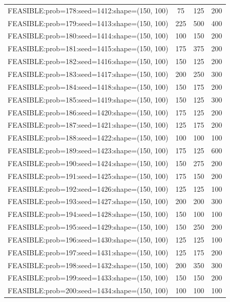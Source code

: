 \begin{longtable}{lccc}
FEASIBLE:prob=178:seed=1412:shape=(150, 100) &       75 &   125 &    200 \\
FEASIBLE:prob=179:seed=1413:shape=(150, 100) &      225 &   500 &    400 \\
FEASIBLE:prob=180:seed=1414:shape=(150, 100) &      100 &   150 &    200 \\
FEASIBLE:prob=181:seed=1415:shape=(150, 100) &      175 &   375 &    200 \\
FEASIBLE:prob=182:seed=1416:shape=(150, 100) &      150 &   125 &    200 \\
FEASIBLE:prob=183:seed=1417:shape=(150, 100) &      200 &   250 &    300 \\
FEASIBLE:prob=184:seed=1418:shape=(150, 100) &      150 &   175 &    200 \\
FEASIBLE:prob=185:seed=1419:shape=(150, 100) &      150 &   125 &    300 \\
FEASIBLE:prob=186:seed=1420:shape=(150, 100) &      175 &   125 &    200 \\
FEASIBLE:prob=187:seed=1421:shape=(150, 100) &      125 &   175 &    200 \\
FEASIBLE:prob=188:seed=1422:shape=(150, 100) &      100 &   100 &    100 \\
FEASIBLE:prob=189:seed=1423:shape=(150, 100) &      175 &   125 &    600 \\
FEASIBLE:prob=190:seed=1424:shape=(150, 100) &      150 &   275 &    200 \\
FEASIBLE:prob=191:seed=1425:shape=(150, 100) &      175 &   150 &    200 \\
FEASIBLE:prob=192:seed=1426:shape=(150, 100) &      125 &   125 &    100 \\
FEASIBLE:prob=193:seed=1427:shape=(150, 100) &      200 &   200 &    300 \\
FEASIBLE:prob=194:seed=1428:shape=(150, 100) &      150 &   100 &    100 \\
FEASIBLE:prob=195:seed=1429:shape=(150, 100) &      150 &   250 &    200 \\
FEASIBLE:prob=196:seed=1430:shape=(150, 100) &      125 &   125 &    100 \\
FEASIBLE:prob=197:seed=1431:shape=(150, 100) &      125 &   175 &    200 \\
FEASIBLE:prob=198:seed=1432:shape=(150, 100) &      200 &   350 &    300 \\
FEASIBLE:prob=199:seed=1433:shape=(150, 100) &      150 &   150 &    200 \\
FEASIBLE:prob=200:seed=1434:shape=(150, 100) &      100 &   100 &    100 \\

\end{longtable}
